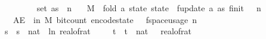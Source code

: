 \begin{isabellebody}
\ \ \ {\isachardoublequoteopen}{\isasymdelta}\ {\isasymin}\ {\isacharbraceleft}{\kern0pt}{}{\isacharless}{\kern0pt}{\isachardot}{\kern0pt}{\isachardot}{\kern0pt}{\isacharless}{\kern0pt}{}{\isacharbraceright}{\kern0pt}{\isachardoublequoteclose}\isanewline
\ \ \ {\isachardoublequoteopen}set\ as\ {\isasymsubseteq}\ {\isacharbraceleft}{\kern0pt}{}{\isachardot}{\kern0pt}{\isachardot}{\kern0pt}{\isacharless}{\kern0pt}n{\isacharbraceright}{\kern0pt}{\isachardoublequoteclose}\isanewline
\ \ \ {\isachardoublequoteopen}M\ {\isasymequiv}\ fold\ {\isacharparenleft}{\kern0pt}{\isasymlambda}a\ state{\isachardot}{\kern0pt}\ state\ {\isasymbind}\ f{}{\isacharunderscore}{\kern0pt}update\ a{\isacharparenright}{\kern0pt}\ as\ {\isacharparenleft}{\kern0pt}f{}{\isacharunderscore}{\kern0pt}init\ {\isasymdelta}\ {\isasymepsilon}\ n{\isacharparenright}{\kern0pt}{\isachardoublequoteclose}\isanewline
\ \ \ {\isachardoublequoteopen}AE\ {\isasymomega}\ in\ M{\isachardot}{\kern0pt}\ bit{\isacharunderscore}{\kern0pt}count\ {\isacharparenleft}{\kern0pt}encode{\isacharunderscore}{\kern0pt}state\ {\isasymomega}{\isacharparenright}{\kern0pt}\ {\isasymle}\ f{}{\isacharunderscore}{\kern0pt}space{\isacharunderscore}{\kern0pt}usage\ {\isacharparenleft}{\kern0pt}n{\isacharcomma}{\kern0pt}\ {\isasymepsilon}{\isacharcomma}{\kern0pt}\ {\isasymdelta}{\isacharparenright}{\kern0pt}{\isachardoublequoteclose}\isanewline
%
\isadelimproof
%
\endisadelimproof
%
\isatagproof
{}\isamarkupfalse%
\ {\isacharminus}{\kern0pt}\isanewline
\ \ \isamarkupfalse%
\ s\ \ {\isachardoublequoteopen}s\ {\isacharequal}{\kern0pt}\ nat\ {\isasymlceil}{\isacharminus}{\kern0pt}{\isacharparenleft}{\kern0pt}{}{}{\isacharasterisk}{\kern0pt}\ ln\ {\isacharparenleft}{\kern0pt}real{\isacharunderscore}{\kern0pt}of{\isacharunderscore}{\kern0pt}rat\ {\isasymepsilon}{\isacharparenright}{\kern0pt}{\isacharparenright}{\kern0pt}{\isasymrceil}{\isachardoublequoteclose}\isanewline
\ \ \isamarkupfalse%
\ t\ \ {\isachardoublequoteopen}t\ {\isacharequal}{\kern0pt}\ nat\ {\isasymlceil}{}{}\ {\isacharslash}{\kern0pt}\ {\isacharparenleft}{\kern0pt}real{\isacharunderscore}{\kern0pt}of{\isacharunderscore}{\kern0pt}rat\ {\isasymdelta}{\isacharparenright}{\kern0pt}\isanewline
\ \ \isamarkupfalse%

\end{isabellebody}
